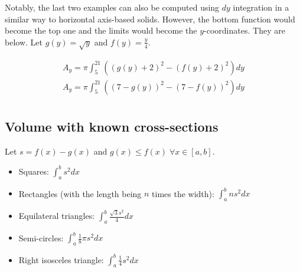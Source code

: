 Notably, the last two examples can also be computed using $dy$ integration in a similar way to horizontal axis-based solids. 
However, the bottom function would become the top one and the limits would become the $y$-coordinates.
They are below.
Let $g(y)=\sqrt{y}$ and $f(y)=\frac{y}{4}$.

\begin{gather*}
    A_y=\pi \int_{5}^{21}((g(y)+2)^2-(f(y)+2)^2)dy\\
    A_y=\pi \int_{5}^{21}((7-g(y))^2-(7-f(y))^2)dy\\
\end{gather*}

\subsection{Volume with known cross-sections}

Let $s=f(x)-g(x)$ and $g(x)\leq{f(x)}\;\forall{x}\in{[a,b]}$.

\begin{itemize}
    \item Squares: $\int_{a}^{b}s^2dx$
    \item Rectangles (with the length being $n$ times the width): $\int_{a}^{b}ns^2dx$
    \item Equilateral triangles: $\int_{a}^{b}\frac{\sqrt{3}s^2}{4}dx$
    \item Semi-circles: $\int_{a}^{b}\frac{1}{8}\pi s^2dx$
    \item Right isosceles triangle: $\int_{a}^{b}\frac{1}{4}s^2dx$
\end{itemize}
